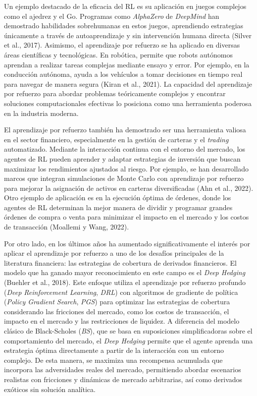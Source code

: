 \documentclass[11pt,a4paper,spanish]{article}
\numberwithin{equation}{section} %
\begin{document}
Un ejemplo destacado de la eficacia del RL es su aplicación en juegos complejos como el ajedrez y el Go. Programas como \textit{AlphaZero} de \textit{DeepMind} han demostrado habilidades sobrehumanas en estos juegos, aprendiendo estrategias únicamente a través de autoaprendizaje y sin intervención humana directa (Silver et al., 2017). Asimismo, el aprendizaje por refuerzo se ha aplicado en diversas áreas científicas y tecnológicas. En robótica, permite que robots autónomos aprendan a realizar tareas complejas mediante ensayo y error. Por ejemplo, en la conducción autónoma, ayuda a los vehículos a tomar decisiones en tiempo real para navegar de manera segura (Kiran et al., 2021). La capacidad del aprendizaje por refuerzo para abordar problemas teóricamente complejos y encontrar soluciones computacionales efectivas lo posiciona como una herramienta poderosa en la industria moderna.

El aprendizaje por refuerzo también ha demostrado ser una herramienta valiosa en el sector financiero, especialmente en la gestión de carteras y el \textit{trading} automatizado. Mediante la interacción continua con el entorno del mercado, los agentes de RL pueden aprender y adaptar estrategias de inversión que buscan maximizar los rendimientos ajustados al riesgo. Por ejemplo, se han desarrollado marcos que integran simulaciones de Monte Carlo con aprendizaje por refuerzo para mejorar la asignación de activos en carteras diversificadas (Ahn et al., 2022). Otro ejemplo de aplicación es en la ejecución óptima de órdenes, donde los agentes de RL determinan la mejor manera de dividir y programar grandes órdenes de compra o venta para minimizar el impacto en el mercado y los costos de transacción (Moallemi y Wang, 2022).

Por otro lado, en los últimos años ha aumentado significativamente el interés por aplicar el aprendizaje por refuerzo a uno de los desafíos principales de la literatura financiera: las estrategias de cobertura de derivados financieros. El modelo que ha ganado mayor reconocimiento en este campo es el \textit{Deep Hedging} (Buehler et al., 2018). Este enfoque utiliza el aprendizaje por refuerzo profundo (\textit{Deep Reinforcement Learning}, \textit{DRL}) con algoritmos de gradiente de política (\textit{Policy Gradient Search}, \textit{PGS}) para optimizar las estrategias de cobertura considerando las fricciones del mercado, como los costos de transacción, el impacto en el mercado y las restricciones de liquidez. A diferencia del modelo clásico de Black-Scholes (\textit{BS}), que se basa en suposiciones simplificadoras sobre el comportamiento del mercado, el \textit{Deep Hedging} permite que el agente aprenda una estrategia óptima directamente a partir de la interacción con un entorno complejo. De esta manera, se maximiza una recompensa acumulada que incorpora las adversidades reales del mercado, permitiendo abordar escenarios realistas con fricciones y dinámicas de mercado arbitrarias, así como derivados exóticos sin solución analítica.
\end{document}
